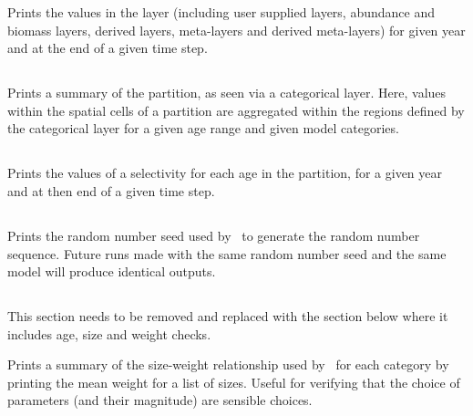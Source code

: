 Prints the values in the layer (including user supplied layers, abundance and biomass layers, derived layers, meta-layers and derived meta-layers) for given year and at the end of a given time step. 

\subsection{}

Prints a summary of the partition, as seen via a categorical layer. Here, values within the spatial cells of a partition are aggregated within the regions defined by the categorical layer for a given age range and given model categories.

\subsection{}

Prints the values of a selectivity for each age in the partition, for a given year and at then end of a given time step.

\subsection{}

Prints the random number seed used by \SPM\ to generate the random number sequence. Future runs made with the same random number seed and the same model will produce identical outputs.

\subsection{\label{sec:report-weight-at-size}}

\TOUNDO
 
This section needs to be removed and replaced with the section below where it includes age, size and weight checks.

Prints a summary of the size-weight relationship used by \SPM\ for each category by printing the mean weight for a list of sizes. Useful for verifying that the choice of parameters (and their magnitude) are sensible choices.

\TOUNDOend

